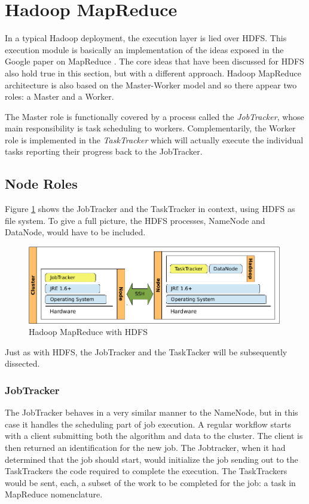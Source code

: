 \section{Hadoop MapReduce}\label{sec:hadoopmapred}
\noindent In a typical Hadoop deployment, the execution layer is lied over HDFS. This execution module is basically an implementation of the ideas exposed in the Google paper on MapReduce \cite{googlemapreduce}. The core ideas that have been discussed for HDFS also hold true in this section, but with a different approach. Hadoop MapReduce architecture is also based on the Master-Worker model and so there appear two roles: a Master and a Worker.

The Master role is functionally covered by a process called the \emph{JobTracker}, whose main responsibility is task scheduling to workers. Complementarily, the Worker role is implemented in the \emph{TaskTracker} which will actually execute the individual tasks reporting their progress back to the JobTracker.

\subsection{Node Roles}\label{subsec:rolesnodosmapred}
\noindent Figure \ref{fig:desplieguehadoopmapred} shows the JobTracker and the TaskTracker in context, using HDFS as file system. To give a full picture, the HDFS processes, NameNode and DataNode, would have to be included.

\begin{figure}[tbp]
\begin{center}
\includegraphics[width=0.99\textwidth]{imagenes/020.pdf}
 \caption{Hadoop MapReduce with HDFS}
\label{fig:desplieguehadoopmapred}
\end{center}
\end{figure}

Just as with HDFS, the JobTracker and the TaskTacker will be subsequently dissected.

\subsubsection{JobTracker}\label{subsubsec:jobtracker}
\noindent The JobTracker behaves in a very similar manner to the NameNode, but in this case it handles the scheduling part of job execution. A regular workflow starts with a client submitting both the algorithm and data to the cluster. The client is then returned an identification for the new job. The Jobtracker, when it had determined that the job should start, would initialize the job sending out to the TaskTrackers the code required to complete the execution. The TaskTrackers would be sent, each, a subset of the work to be completed for the job: a task in MapReduce nomenclature.

